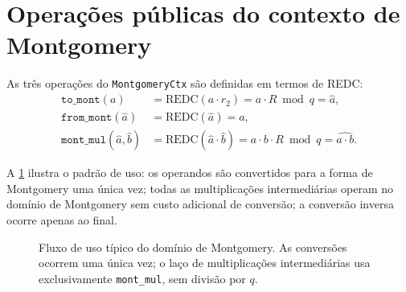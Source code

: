 \documentclass[11pt,a4paper]{report}
\begin{document}
\section{Operações públicas do contexto de Montgomery}
\label{sec:mont_ops}

As três operações do \texttt{MontgomeryCtx} são definidas em termos de REDC:
\begin{align}
  \texttt{to\_mont}(a) &= \text{REDC}(a \cdot r_2) = a \cdot R \bmod q = \hat{a},
    \label{eq:to_mont}\\
  \texttt{from\_mont}(\hat{a}) &= \text{REDC}(\hat{a}) = a,
    \label{eq:from_mont}\\
  \texttt{mont\_mul}(\hat{a}, \hat{b}) &= \text{REDC}(\hat{a} \cdot \hat{b})
    = a \cdot b \cdot R \bmod q = \widehat{a \cdot b}.
    \label{eq:mont_mul}
\end{align}

A \cref{fig:montgomery_flow} ilustra o padrão de uso: os operandos são convertidos
para a forma de Montgomery uma única vez; todas as multiplicações intermediárias operam
no domínio de Montgomery sem custo adicional de conversão; a conversão inversa ocorre
apenas ao final.

\begin{figure}[ht]
\centering
{}
\caption{Fluxo de uso típico do domínio de Montgomery. As conversões ocorrem uma única vez;
o laço de multiplicações intermediárias usa exclusivamente \texttt{mont\_mul}, sem divisão
por $q$.}
\label{fig:montgomery_flow}
\end{figure}
\end{document}
